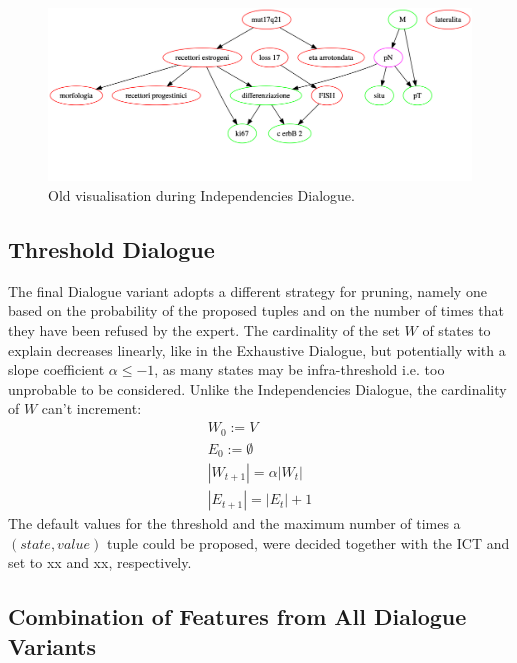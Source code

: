 \begin{figure}[htbp]
\centerline{\includegraphics[width=\columnwidth]{results/images/independencies_dialogue_output_old}}
\caption{Old visualisation during Independencies Dialogue.}
\label{fig:independencies_dialogue_output_old}
\end{figure}

\subsection{Threshold Dialogue}
The final Dialogue variant adopts a different strategy for pruning, namely one based on the probability of the proposed tuples and on the number of times that they have been refused by the expert.
The cardinality of the set $W$ of states to explain decreases linearly, like in the Exhaustive Dialogue, but potentially with a slope coefficient $\alpha \leq -1$, as many states may be infra-threshold i.e. too unprobable to be considered.
Unlike the Independencies Dialogue, the cardinality of $W$ can't increment:
\begin{align}
	W_0 := V \\
	E_0 := \emptyset \\
	|W_{t+1}| = \alpha |W_t| \\
	|E_{t+1}| = |E_t| + 1
\end{align}
The default values for the threshold and the maximum number of times a $(state, value)$ tuple could be proposed, were decided together with the ICT and set to xx and xx, respectively.

\subsection{Combination of Features from All Dialogue Variants}


